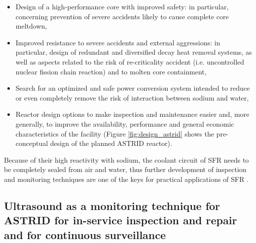     \begin{itemize}
       \item  Design of a high-performance core with improved safety: in particular, concerning prevention of severe accidents likely to cause complete core
meltdown,
       \item  Improved resistance to severe accidents and external aggressions: in particular, design of redundant and diversified decay heat removal systems,
as well as aspects related to the risk of re-criticality accident (i.e. uncontrolled nuclear fission chain reaction) and to molten core containment,
       \item  Search for an optimized and safe power conversion system intended to reduce or even completely remove the risk of interaction between sodium and
water,
       \item  Reactor design options to make inspection and maintenance easier and, more generally, to improve the availability, performance and general
economic characteristics of the facility
       (Figure \ref{fig:design_astrid} shows the pre-conceptual design of the planned ASTRID reactor).
    \end{itemize}
    Because of their high reactivity with sodium, the coolant circuit of SFR needs to be completely sealed from air and water, thus
further development of inspection and monitoring techniques are one of the keys for practical applications of SFR \parencite{GIF2014TechnologyRoadmapUpdate}.

\subsection{Ultrasound as a monitoring technique for ASTRID for in-service inspection and repair and for continuous surveillance} \label{ssec:ac_nuc}

